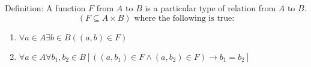 Definition: A function $F$ from $A$ to $B$ is a particular type of relation from $A$ to $B$.
\[ \left( F \subseteq A \times B\right) \text{ where the following is true:}\]
\begin{enumerate}
    \item $ \forall a \in A \exists b \in B \left( (a,b) \in F \right) $
    \item $ \forall a \in A \forall b_1,b_2 \in B \left[ \left( (a,b_1) \in F \wedge (a,b_2) \in F\right) \to b_1 = b_2 \right] $
\end{enumerate}


